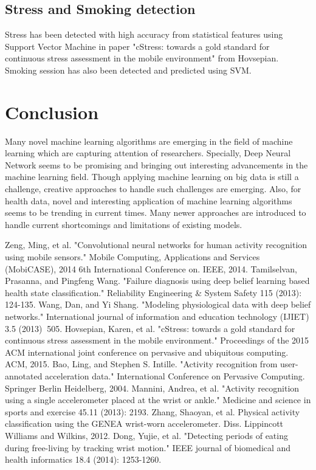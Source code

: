 \documentclass[conference]{IEEEtran}
\begin{document}
\subsection{Stress and Smoking detection}
Stress has been detected with high accuracy from statistical features using Support Vector Machine in paper "cStress: towards a gold standard for continuous stress assessment in the mobile environment" from Hovsepian. Smoking session has also been detected and predicted using SVM. 
\section{Conclusion}
Many novel machine learning algorithms are emerging in the field of machine learning which are capturing attention of researchers. Specially, Deep Neural Network seems to be promising and bringing out interesting advancements in the machine learning field. Though applying machine learning on big data is still a challenge, creative approaches to handle such challenges are emerging. Also, for health data, novel and interesting application of machine learning algorithms seems to be trending in current times. Many newer approaches are introduced to handle current shortcomings and limitations of existing models. 

\begin{thebibliography}{1}
Zeng, Ming, et al. "Convolutional neural networks for human activity recognition using mobile sensors." Mobile Computing, Applications and Services (MobiCASE), 2014 6th International Conference on. IEEE, 2014.
Tamilselvan, Prasanna, and Pingfeng Wang. "Failure diagnosis using deep belief learning based health state classification." Reliability Engineering \& System Safety 115 (2013)$:$124-135.
Wang, Dan, and Yi Shang. "Modeling physiological data with deep belief networks." International journal of information and education technology (IJIET) 3.5 (2013)$\:$ 505.
Hovsepian, Karen, et al. "cStress: towards a gold standard for continuous stress assessment in the mobile environment." Proceedings of the 2015 ACM international joint conference on pervasive and ubiquitous computing. ACM, 2015. 
Bao, Ling, and Stephen S. Intille. "Activity recognition from user-annotated acceleration data." International Conference on Pervasive Computing. Springer Berlin Heidelberg, 2004.
Mannini, Andrea, et al. "Activity recognition using a single accelerometer placed at the wrist or ankle." Medicine and science in sports and exercise 45.11 (2013): 2193.
Zhang, Shaoyan, et al. Physical activity classification using the GENEA wrist-worn accelerometer. Diss. Lippincott Williams and Wilkins, 2012.
Dong, Yujie, et al. "Detecting periods of eating during free-living by tracking wrist motion." IEEE journal of biomedical and health informatics 18.4 (2014): 1253-1260.
\end{thebibliography}
\end{document}
